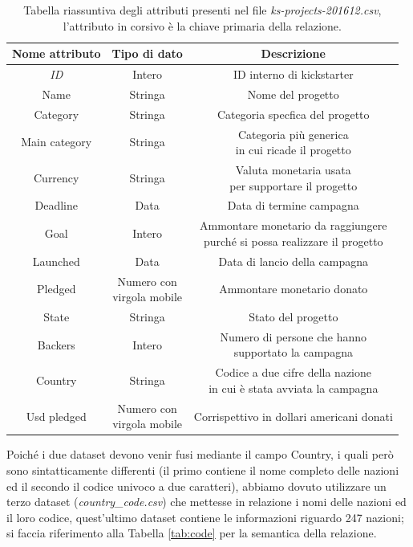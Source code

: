 \begin{table}
	\caption{Tabella riassuntiva degli attributi presenti nel file \textit{ks-projects-201612.csv}, l'attributo in corsivo è la chiave primaria della relazione.}
	
	\label{tab:ks}
	
	\centering
	\begin{tabular}{|c|c|c|}
		\hline
		\textbf{Nome attributo} & \textbf{Tipo di dato} & \textbf{Descrizione} \\ 
		\hline  
		\rule{0pt}{13pt}\emph{ID} & Intero & ID interno di kickstarter \\ 
		\hline  
		\rule{0pt}{13pt}Name & Stringa & Nome del progetto \\ 
		\hline  
		\rule{0pt}{13pt}Category & Stringa & Categoria specfica del progetto \\ 
		\hline  
		\rule{0pt}{24pt}Main category & Stringa & \shortstack{Categoria più generica \\ in cui ricade il progetto} \\ 
		\hline   
		\rule{0pt}{24pt}Currency & Stringa & \shortstack{Valuta monetaria usata \\ per supportare il progetto} \\ 
		\hline   
		\rule{0pt}{13pt}Deadline & Data & Data di termine campagna \\ 
		\hline   
		\rule{0pt}{24pt}Goal & Intero & \shortstack{Ammontare monetario da raggiungere \\ purché si possa realizzare il progetto} \\ 
		\hline  
		\rule{0pt}{13pt}Launched & Data & Data di lancio della campagna \\ 
		\hline  
		\rule{0pt}{24pt}Pledged & \shortstack{Numero con \\ virgola mobile} & Ammontare monetario donato \\ 
		\hline  
		\rule{0pt}{13pt}State & Stringa & Stato del progetto \\ 
		\hline  
		\rule{0pt}{24pt}Backers & Intero & \shortstack{Numero di persone che hanno \\ supportato la campagna} \\ 
		\hline  
		\rule{0pt}{24pt}Country & Stringa & \shortstack{Codice a due cifre della nazione \\ in cui è stata avviata la campagna} \\ 
		\hline  
		\rule{0pt}{24pt}Usd pledged & \shortstack{Numero con \\ virgola mobile} & Corrispettivo in dollari americani donati \\ 
		\hline
	\end{tabular}
\end{table} 
Poiché i due dataset devono venir fusi mediante il campo Country, i quali però sono sintatticamente differenti (il primo contiene il nome completo delle nazioni ed il secondo il codice univoco a due caratteri), abbiamo dovuto utilizzare un terzo dataset (\textit{country\_code.csv}) che mettesse in relazione i nomi delle nazioni ed il loro codice, quest'ultimo dataset contiene le informazioni riguardo 247 nazioni; si faccia riferimento alla Tabella \ref{tab:code} per la semantica della relazione.

